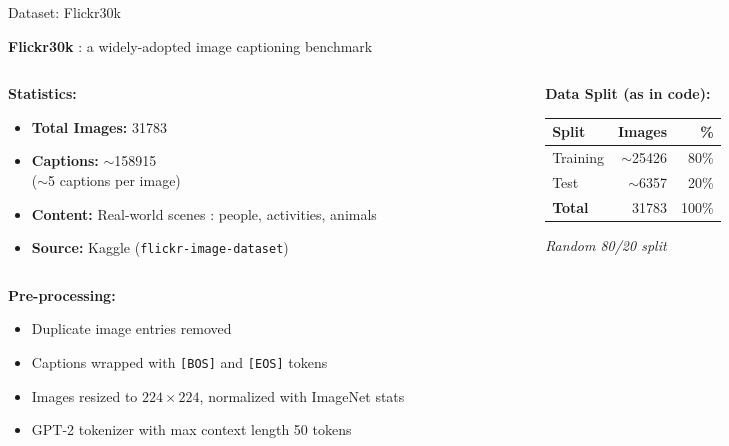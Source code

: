 \documentclass{beamer}
\begin{document}
\begin{frame}{Dataset: Flickr30k}

    \textbf{Flickr30k} : a widely-adopted image captioning benchmark

    \vspace{0.1cm}
    \begin{columns}[T]
    \begin{column}{0.50\textwidth}
        \textbf{Statistics:}
        \begin{itemize}
            \item \textbf{Total Images:} 31783
            \item \textbf{Captions:} $\sim$158915 \\
                  ($\sim$5 captions per image)
            \item \textbf{Content:} Real-world scenes : people, activities, animals
            \item \textbf{Source:} Kaggle (\texttt{flickr-image-dataset})
        \end{itemize}
    \end{column}
    \begin{column}{0.48\textwidth}
        \textbf{Data Split (as in code):}
        \begin{center}
        \begin{tabular}{lrr}
        \toprule
        \textbf{Split} & \textbf{Images} & \textbf{\%} \\
        \midrule
        Training & $\sim$25426 & 80\% \\
        Test     & $\sim$6357 & 20\% \\
        \midrule
        \textbf{Total} & 31783 & 100\% \\
        \bottomrule
        \end{tabular}
        \end{center}
        \small\textit{Random 80/20 split}
    \end{column}
    \end{columns}

    \vspace{0.1cm}
    \textbf{Pre-processing:}
    \begin{itemize}
        \item Duplicate image entries removed
        \item Captions wrapped with \texttt{[BOS]} and \texttt{[EOS]} tokens
        \item Images resized to $224\times224$, normalized with ImageNet stats
        \item GPT-2 tokenizer with max context length 50 tokens
    \end{itemize}

\end{frame}
\end{document}
